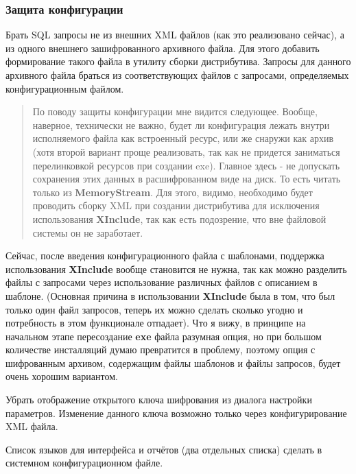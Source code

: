 \subsubsection{Защита конфигурации}

Брать SQL запросы не из внешних XML файлов (как это реализовано сейчас), а из одного внешнего
зашифрованного архивного файла. Для этого добавить формирование такого файла в утилиту сборки
дистрибутива. Запросы для данного архивного файла браться из соответствующих файлов с запросами,
определяемых конфигурационным файлом.

\begin{quote}

	По поводу защиты конфигурации мне видится следующее. Вообще, наверное, технически не важно,
	будет ли конфигурация лежать внутри исполняемого файла как встроенный ресурс, или же снаружи как
	архив (хотя второй вариант проще реализовать, так как не придется заниматься перелинковкой
	ресурсов при создании exe). Главное здесь - не допускать сохранения этих данных в расшифрованном
	виде на диск. То есть читать только из \textbf{Memory\-Stream}. Для этого, видимо, необходимо
	будет проводить сборку XML при создании дистрибутива для исключения использования
	\textbf{XInc\-lude}, так как есть подозрение, что вне файловой системы он не заработает.

\end{quote}

\bigskip

Сейчас, после введения конфигурационного файла с шаблонами, поддержка использования
\textbf{XInc\-lude} вообще становится не нужна, так как можно разделить файлы с запросами через
использование различных файлов с описанием в шаблоне. (Основная причина в использовании
\textbf{XInc\-lude} была в том, что был только один файл запросов, теперь их можно сделать сколько
угодно и потребность в этом функционале отпадает). Что я вижу, в принципе на начальном этапе
пересоздание \textbf{exe} файла разумная опция, но при большом количестве инсталляций думаю
превратится в проблему, поэтому опция с шифрованным архивом, содержащим файлы шаблонов и файлы
запросов, будет очень хорошим вариантом.

\bigskip

Убрать отображение открытого ключа шифрования из диалога настройки параметров. Изменение данного
ключа возможно только через конфигурирование XML файла.

\bigskip

Список языков для интерфейса и отчётов (два отдельных списка) сделать в системном конфигурационном
файле.

